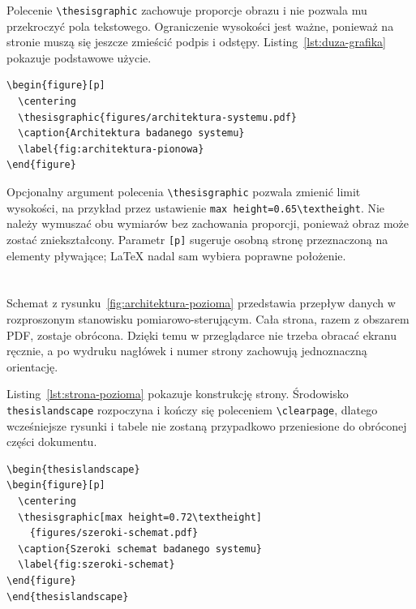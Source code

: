 Polecenie \verb|\thesisgraphic| zachowuje proporcje obrazu i nie pozwala mu przekroczyć pola tekstowego. Ograniczenie wysokości jest ważne, ponieważ na stronie muszą się jeszcze zmieścić podpis i odstępy. Listing~\ref{lst:duza-grafika} pokazuje podstawowe użycie.

\begin{lstlisting}[style=thesis,caption={Bezpieczne wstawienie dużej grafiki},label={lst:duza-grafika}]
\begin{figure}[p]
  \centering
  \thesisgraphic{figures/architektura-systemu.pdf}
  \caption{Architektura badanego systemu}
  \label{fig:architektura-pionowa}
\end{figure}
\end{lstlisting}

Opcjonalny argument polecenia \verb|\thesisgraphic| pozwala zmienić limit wysokości, na przykład przez ustawienie \verb|max height=0.65\textheight|. Nie należy wymuszać obu wymiarów bez zachowania proporcji, ponieważ obraz może zostać zniekształcony. Parametr \texttt{[p]} sugeruje osobną stronę przeznaczoną na elementy pływające; LaTeX nadal sam wybiera poprawne położenie.

\section{}

Schemat z rysunku~\ref{fig:architektura-pozioma} przedstawia przepływ danych w rozproszonym stanowisku pomiarowo-sterującym. Cała strona, razem z obszarem PDF, zostaje obrócona. Dzięki temu w przeglądarce nie trzeba obracać ekranu ręcznie, a po wydruku nagłówek i numer strony zachowują jednoznaczną orientację.

Listing~\ref{lst:strona-pozioma} pokazuje konstrukcję strony. Środowisko \texttt{thesislandscape} rozpoczyna i kończy się poleceniem \verb|\clearpage|, dlatego wcześniejsze rysunki i tabele nie zostaną przypadkowo przeniesione do obróconej części dokumentu.

\begin{lstlisting}[style=thesis,caption={Umieszczenie rysunku na oddzielnej stronie poziomej},label={lst:strona-pozioma}]
\begin{thesislandscape}
\begin{figure}[p]
  \centering
  \thesisgraphic[max height=0.72\textheight]
    {figures/szeroki-schemat.pdf}
  \caption{Szeroki schemat badanego systemu}
  \label{fig:szeroki-schemat}
\end{figure}
\end{thesislandscape}
\end{lstlisting}

